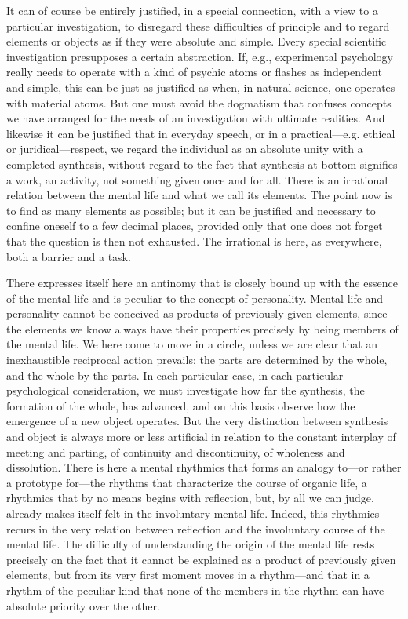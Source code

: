 \documentclass[12pt,a4paper]{book}
\newcommand{\opage}[1]{\marginnote{\footnotesize\textit{[#1]}}}
\begin{document}
It can of course be entirely justified, in a special connection, with a
view to a particular investigation, to disregard these difficulties of
principle and to regard elements or objects as if they were absolute and
simple. Every special scientific investigation presupposes a certain
abstraction. If, e.g., experimental psychology really needs to operate
with a kind of psychic atoms or flashes as independent and simple, this
can be just as justified as when, in natural science, one operates with
material atoms. But one must avoid the dogmatism that confuses concepts
we have arranged for the needs of an investigation with ultimate
realities. And likewise it can be justified that in everyday speech, or
in a practical---e.g. ethical or juridical---respect, we regard the
individual as an absolute unity with a completed synthesis, without
regard to the fact that synthesis at bottom signifies a work, an
activity, not something given once and for all. There is an irrational
relation between the mental life and what we call its elements. The
point now is to find as many elements as possible; but it can be
justified and necessary to confine oneself to a few decimal places,
provided only that one does not forget that the question is then not
exhausted. The irrational is here, as everywhere, both a barrier and a
task.

There expresses itself here an antinomy that is closely bound up with
the essence of the mental life and is peculiar to the concept of
personality. Mental life and personality cannot be conceived as products
of previously given elements, since the elements we know always have
their properties precisely by being members of the mental life. We here
come to move in a circle, unless we are clear that an inexhaustible
reciprocal action prevails: the parts are determined by the whole, and
the whole by the parts. In each particular case, in each particular
psychological consideration, we must investigate \opage{15}how far the synthesis,
the formation of the whole, has advanced, and on this basis observe how
the emergence of a new object operates. But the very distinction between
synthesis and object is always more or less artificial in relation to
the constant interplay of meeting and parting, of continuity and
discontinuity, of wholeness and dissolution. There is here a mental
rhythmics that forms an analogy to---or rather a prototype for---the
rhythms that characterize the course of organic life, a rhythmics that
by no means begins with reflection, but, by all we can judge, already
makes itself felt in the involuntary mental life. Indeed, this rhythmics
recurs in the very relation between reflection and the involuntary
course of the mental life. The difficulty of understanding the origin of
the mental life rests precisely on the fact that it cannot be explained
as a product of previously given elements, but from its very first
moment moves in a rhythm---and that in a rhythm of the peculiar kind
that none of the members in the rhythm can have absolute priority over
the other.
\end{document}
